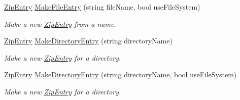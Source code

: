 \begin{DoxyCompactItemize}
\hyperlink{class_i_c_sharp_code_1_1_sharp_zip_lib_1_1_zip_1_1_zip_entry}{Zip\+Entry} \hyperlink{class_i_c_sharp_code_1_1_sharp_zip_lib_1_1_zip_1_1_zip_entry_factory_acd4d7e502c4517ce588d2660e56c14b5}{Make\+File\+Entry} (string file\+Name, bool use\+File\+System)
\begin{DoxyCompactList}\small\item\em Make a new \hyperlink{class_i_c_sharp_code_1_1_sharp_zip_lib_1_1_zip_1_1_zip_entry}{Zip\+Entry} from a name. \end{DoxyCompactList}\item 
\hyperlink{class_i_c_sharp_code_1_1_sharp_zip_lib_1_1_zip_1_1_zip_entry}{Zip\+Entry} \hyperlink{class_i_c_sharp_code_1_1_sharp_zip_lib_1_1_zip_1_1_zip_entry_factory_ad55262fe2c27de18177df0122284098d}{Make\+Directory\+Entry} (string directory\+Name)
\begin{DoxyCompactList}\small\item\em Make a new \hyperlink{class_i_c_sharp_code_1_1_sharp_zip_lib_1_1_zip_1_1_zip_entry}{Zip\+Entry} for a directory. \end{DoxyCompactList}\item 
\hyperlink{class_i_c_sharp_code_1_1_sharp_zip_lib_1_1_zip_1_1_zip_entry}{Zip\+Entry} \hyperlink{class_i_c_sharp_code_1_1_sharp_zip_lib_1_1_zip_1_1_zip_entry_factory_a9fcaf5dd4ef695b41c6203a8f1e4d119}{Make\+Directory\+Entry} (string directory\+Name, bool use\+File\+System)
\begin{DoxyCompactList}\small\item\em Make a new \hyperlink{class_i_c_sharp_code_1_1_sharp_zip_lib_1_1_zip_1_1_zip_entry}{Zip\+Entry} for a directory. \end{DoxyCompactList}\end{DoxyCompactItemize}
